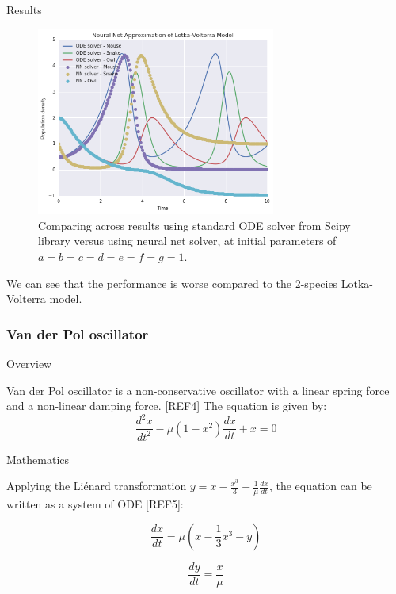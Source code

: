 \documentclass[11pt]{article}
\begin{document}
Results
\begin{figure}
\centering
\includegraphics[width=0.7\textwidth]{LV_Compare_3_species.png}
      \caption{Comparing across results using standard ODE solver from Scipy library versus using neural net solver, at initial parameters of $a = b = c = d = e = f = g = 1 $.\label{fig:LVFig_3_species}}
\end{figure}

We can see that the performance is worse compared to the 2-species Lotka-Volterra model. 

\subsubsection{Van der Pol oscillator}
Overview

Van der Pol oscillator is a non-conservative oscillator with a linear spring force and a non-linear damping force.  [REF4] The equation is given by:
     \begin{equation}
      \frac{d^2x}{dt^2} - \mu(1-x^2)\frac{dx}{dt} + x = 0
      \label{eq:VDP}
    \end{equation}
    
Mathematics

Applying the Li\'enard transformation $y = x - \frac{x^3}{3} - \frac{1}{\mu}\frac{dx}{dt}$, the equation can be written as a system of ODE [REF5]:

     \begin{equation}
      \frac{dx}{dt} = \mu(x - \frac{1}{3}x^3 - y)
      \label{eq:LV4}
    \end{equation}
    
     \begin{equation}
      \frac{dy}{dt} = \frac{x}{\mu}
      \label{eq:LV5}
    \end{equation}
    
\end{document}
